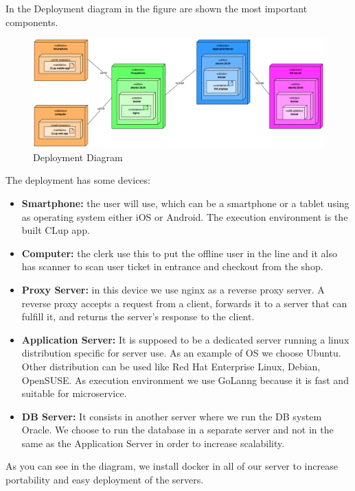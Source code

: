 \vspace{0.5cm}
In the Deployment diagram in the figure are shown the most important components.
\vspace{1cm}
\begin{figure}[H]
  \centering
  \includegraphics[width=\textwidth, keepaspectratio] {images/all/deploymentview.png}
  \caption{Deployment Diagram}
\end{figure}
\vspace{2cm}

The deployment has some devices: \\
\begin{itemize}
    \item \textbf{Smartphone:}  the user will use, which can be a smartphone or a tablet using as operating system either iOS or Android. The execution environment is the built CLup app.\\
    
    \item \textbf{Computer:} the clerk use this to put the offline user in the line and it also has scanner to scan user ticket in entrance and checkout from the shop.\\
    
    \item \textbf{Proxy Server:} in this device we use nginx as a reverse proxy server. A reverse proxy accepts a request from a client, forwards it to a server that can fulfill it, and returns the server's response to the client. \\
    
    \item \textbf{Application Server:} It is supposed to be a dedicated server running a linux distribution specific for server use. As an example of OS we choose Ubuntu. Other distribution can be used like Red Hat Enterprise Linux, Debian, OpenSUSE. As execution environment we use GoLanng because it is fast and suitable for microservice.\\
    
    \item \textbf{DB Server:} It consists in another server where we run the DB system Oracle. We choose to run the database in a separate server and not in the same as the Application Server in order to increase scalability. 
\end{itemize}
As you can see in the diagram, we install docker in all of our server to increase portability and easy deployment of the servers.
